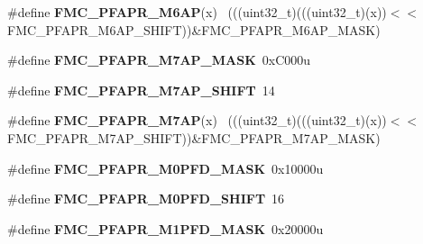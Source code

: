 \begin{DoxyCompactItemize}
\item 
\hypertarget{group___f_m_c___register___masks_ga406209e8b290dac802df4f5eafd631fc}{}\#define {\bfseries F\+M\+C\+\_\+\+P\+F\+A\+P\+R\+\_\+\+M6\+A\+P}(x)                                            ~(((uint32\+\_\+t)(((uint32\+\_\+t)(x))$<$$<$F\+M\+C\+\_\+\+P\+F\+A\+P\+R\+\_\+\+M6\+A\+P\+\_\+\+S\+H\+I\+F\+T))\&F\+M\+C\+\_\+\+P\+F\+A\+P\+R\+\_\+\+M6\+A\+P\+\_\+\+M\+A\+S\+K)\label{group___f_m_c___register___masks_ga406209e8b290dac802df4f5eafd631fc}

\item 
\hypertarget{group___f_m_c___register___masks_ga87c7451b98f752717c6122892b4fc9a9}{}\#define {\bfseries F\+M\+C\+\_\+\+P\+F\+A\+P\+R\+\_\+\+M7\+A\+P\+\_\+\+M\+A\+S\+K}~0x\+C000u\label{group___f_m_c___register___masks_ga87c7451b98f752717c6122892b4fc9a9}

\item 
\hypertarget{group___f_m_c___register___masks_ga8117d628a5889cb4983db0cc892e669c}{}\#define {\bfseries F\+M\+C\+\_\+\+P\+F\+A\+P\+R\+\_\+\+M7\+A\+P\+\_\+\+S\+H\+I\+F\+T}~14\label{group___f_m_c___register___masks_ga8117d628a5889cb4983db0cc892e669c}

\item 
\hypertarget{group___f_m_c___register___masks_ga3033882e65d59a8fe9a900148b76bc59}{}\#define {\bfseries F\+M\+C\+\_\+\+P\+F\+A\+P\+R\+\_\+\+M7\+A\+P}(x)                                            ~(((uint32\+\_\+t)(((uint32\+\_\+t)(x))$<$$<$F\+M\+C\+\_\+\+P\+F\+A\+P\+R\+\_\+\+M7\+A\+P\+\_\+\+S\+H\+I\+F\+T))\&F\+M\+C\+\_\+\+P\+F\+A\+P\+R\+\_\+\+M7\+A\+P\+\_\+\+M\+A\+S\+K)\label{group___f_m_c___register___masks_ga3033882e65d59a8fe9a900148b76bc59}

\item 
\hypertarget{group___f_m_c___register___masks_ga5f6efa8c02f2a2f04d5b62f8de35e9a9}{}\#define {\bfseries F\+M\+C\+\_\+\+P\+F\+A\+P\+R\+\_\+\+M0\+P\+F\+D\+\_\+\+M\+A\+S\+K}~0x10000u\label{group___f_m_c___register___masks_ga5f6efa8c02f2a2f04d5b62f8de35e9a9}

\item 
\hypertarget{group___f_m_c___register___masks_ga5d7609bb54910d8b7be4dc3b868c040c}{}\#define {\bfseries F\+M\+C\+\_\+\+P\+F\+A\+P\+R\+\_\+\+M0\+P\+F\+D\+\_\+\+S\+H\+I\+F\+T}~16\label{group___f_m_c___register___masks_ga5d7609bb54910d8b7be4dc3b868c040c}

\item 
\hypertarget{group___f_m_c___register___masks_ga3288aee0551874c34ce18211489a5f74}{}\#define {\bfseries F\+M\+C\+\_\+\+P\+F\+A\+P\+R\+\_\+\+M1\+P\+F\+D\+\_\+\+M\+A\+S\+K}~0x20000u\label{group___f_m_c___register___masks_ga3288aee0551874c34ce18211489a5f74}


\end{DoxyCompactItemize}
